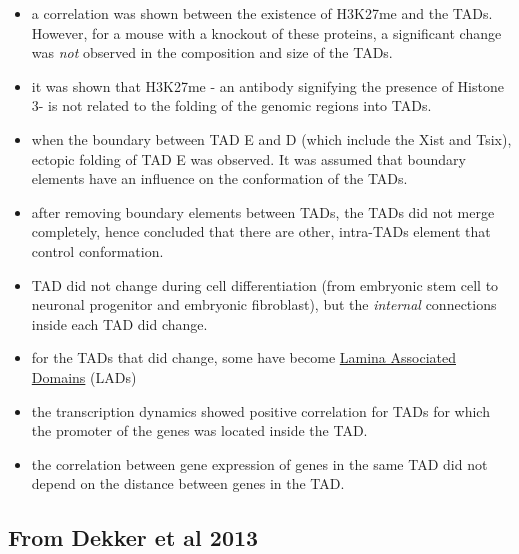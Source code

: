 \documentclass[12pt]{paper}
\begin{document}
\begin{itemize}
\item a correlation was shown between the existence of H3K27me and the TADs. However, for a mouse with a knockout of these proteins, a significant change was \textit{not} observed in the composition and size of the TADs.
\item it was shown that H3K27me - an antibody signifying the presence of Histone 3- is not related to the folding of the genomic regions into TADs. 
\item when the boundary between TAD E and D (which include the Xist and Tsix), ectopic folding of TAD E was observed. It was assumed that boundary elements have an influence on the conformation of the TADs. 
\item after removing boundary elements between TADs, the TADs did not merge completely, hence concluded that there are other, intra-TADs element that control conformation.
\item TAD did not change during cell differentiation (from embryonic stem cell to neuronal progenitor and embryonic fibroblast), but the \textit{internal} connections inside each TAD did change.
\item for the TADs that did change, some have become \href{http://www.nature.com/nature/journal/v453/n7197/full/nature06947.html}{Lamina Associated Domains} (LADs) 
\item the transcription dynamics showed positive correlation for TADs for which the promoter of the genes was located inside the TAD. 
\item the correlation between gene expression of genes in the same TAD did not depend on the distance between genes in the TAD. 
\end{itemize}

\subsection{From Dekker et al 2013 \cite{dekker2013exploring}}


\end{document}
